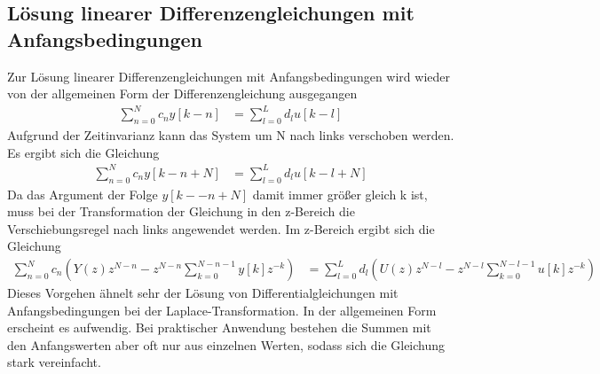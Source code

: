 \subsection{Lösung linearer Differenzengleichungen mit Anfangsbedingungen}\label{sec:luxf6sung-linearer-differenzengleichungen-mit-anfangsbedingungen}

Zur Lösung linearer Differenzengleichungen mit Anfangsbedingungen wird wieder von der allgemeinen Form der Differenzengleichung ausgegangen
\begin{align}
\sum\limits_{n = 0}^{N}{c_{n}  y[ k - n]} &= \sum\limits_{l = 0}^{L}{d_{l}  u[ k - l]} \label{eq:6.11}
\end{align}
Aufgrund der Zeitinvarianz kann das System um N nach links verschoben werden. Es ergibt sich die Gleichung
\begin{align}
\sum\limits_{n = 0}^{N}{c_{n}  y[ k - n + N]} &= \sum\limits_{l = 0}^{L}{d_{l}  u[ k - l + N]} \label{eq:6.12}
\end{align}
Da das Argument der Folge \(y[k -- n + N]\) damit immer größer gleich k ist, muss bei der Transformation der Gleichung in den z-Bereich die Verschiebungsregel nach links angewendet werden. Im z-Bereich ergibt sich die Gleichung
\begin{align}
\sum\limits_{n = 0}^{N}{c_{n}  \left( Y(z)  z^{N - n} - z^{N - n}  \sum\limits_{k = 0}^{N - n - 1}{y[ k]  z^{- k}} \right)} &= \sum\limits_{l = 0}^{L}{d_{l}  \left( U(z)  z^{N - l} - z^{N - l}  \sum\limits_{k = 0}^{N - l - 1}{u[ k]  z^{- k}} \right)} \label{eq:6.13}
\end{align}
Dieses Vorgehen ähnelt sehr der Lösung von Differentialgleichungen mit Anfangsbedingungen bei der Laplace-Transformation. In der allgemeinen Form erscheint es aufwendig. Bei praktischer Anwendung bestehen die Summen mit den Anfangswerten aber oft nur aus einzelnen Werten, sodass sich die Gleichung stark vereinfacht.

